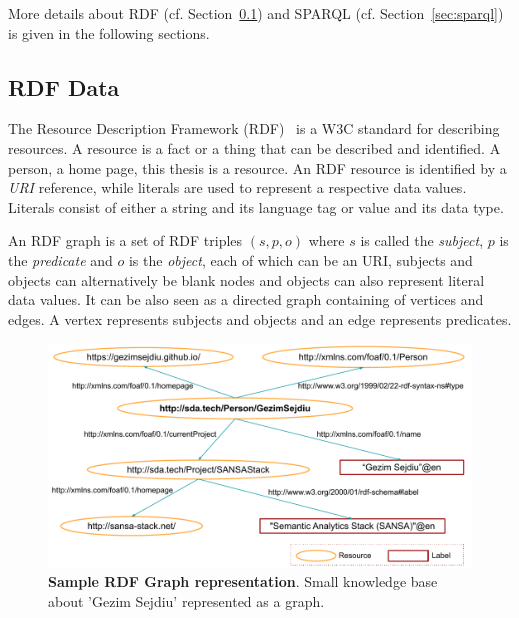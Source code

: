 More details about \gls{RDF} (cf. Section~\ref{sec:rdf-data}) and \gls{SPARQL} (cf. Section~\ref{sec:sparql}) is given in the following sections.
\addtocounter{footnote}{-1}


\subsection{RDF Data}
\label{sec:rdf-data}

The Resource Description Framework (\gls{RDF})~\cite{Wood:14:RCA} is a \gls{W3C} standard for describing resources.
A resource is a fact or a thing that can be described and identified. 
A person, a home page, this thesis is a resource. 
An \gls{RDF} resource is identified by a \emph{\gls{URI}} reference, while literals are used to represent a respective data values.
Literals consist of either a string and its language tag or value and its data type.

An \gls{RDF} graph is a set of \gls{RDF} triples $(s,p,o)$ where $s$ is called the \emph{subject}, $p$ is the \emph{predicate} and $o$ is the \emph{object}, each of which can be an \gls{URI}, subjects and objects can alternatively be blank nodes and objects can also represent literal data values.
It can be also seen as a directed graph containing of vertices and edges. 
A vertex represents subjects and objects and an edge represents predicates.

\begin{figure}
\centering
\includegraphics[width=1.0\columnwidth]{images/2_preliminaries/rdf-triple-example.pdf}
 \caption{\textbf{Sample RDF Graph representation}. Small knowledge base about 'Gezim Sejdiu' represented as a graph.}
\label{fig:preliminaries-rdf-graph-sample}
\end{figure}

